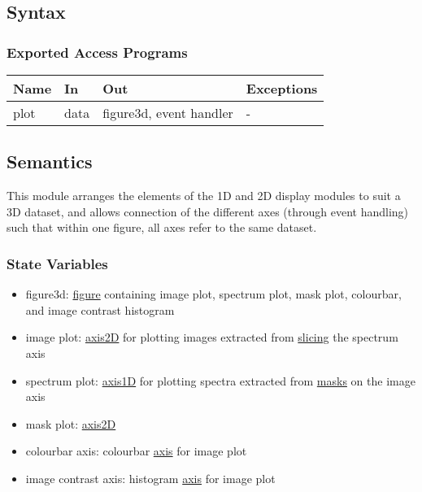 \documentclass[12pt, titlepage]{article}
\begin{document}
\subsection{Syntax}

\subsubsection{Exported Access Programs}

\begin{center}
    \begin{tabular}{p{2cm} p{3cm} p{5cm} p{2cm}}
        \hline
        \textbf{Name} & \textbf{In} & \textbf{Out} & \textbf{Exceptions} \\
        \hline
        plot & data & figure3d, event handler & - \\
        \hline
    \end{tabular}
\end{center}

\subsection{Semantics}
This module arranges the elements of the 1D and 2D display modules to suit a 3D dataset, and allows connection of the different axes (through event handling) such that within one figure, all axes refer to the same dataset.

\subsubsection{State Variables}
\begin{itemize}
    \item figure3d: \hyperref[Mod:Plotting]{figure} containing image plot, spectrum plot, mask plot, colourbar, and image contrast histogram
	\item image plot: \hyperref[Mod:Plotting]{axis2D} for plotting images extracted from \hyperref[Mod:Slice1D]{slicing} the spectrum axis
	\item spectrum plot: \hyperref[Mod:Plotting]{axis1D} for plotting spectra extracted from \hyperref[Mod:Mask2D]{masks} on the image axis
	\item mask plot: \hyperref[Mod:Plotting]{axis2D}
	\item colourbar axis: colourbar \hyperref[Mod:Plotting]{axis} for image plot
    \item image contrast axis: histogram \hyperref[Mod:Plotting]{axis} for image plot
\end{itemize}
\end{document}

